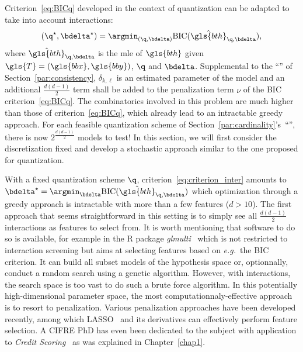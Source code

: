 Criterion~\eqref{eq:BICq} developed in the context of quantization can be adapted to take into account interactions:
\begin{equation} \label{eq:criterion_inter}
(\q^\star,\bdelta^\star) = \argmin_{(\q,\bdelta)} \text{BIC}(\hat{\gls{bth}}_{\q,\bdelta}),
\end{equation}
where $\hat{\gls{bth}}_{\q,\bdelta}$ is the \gls{mle} of $\gls{bth}$ given $\gls{T} = (\gls{bbx},\gls{bby})$, $\q$ and $\bdelta$. Supplemental to the ``'' of Section~\ref{par:consistency}, $\delta_{k,\ell}$ is an estimated parameter of the model and an additional $\frac{d(d-1)}{2}$ term shall be added to the penalization term $\nu$ of the BIC criterion~\eqref{eq:BICq}. The combinatorics involved in this problem are much higher than those of criterion~\eqref{eq:BICq}, which already lead to an intractable greedy approach. For each feasible quantization scheme of Section~\ref{par:cardinality}'s~``'', there is now $2^{\frac{d(d-1)}{2}}$ models to test! In this section, we will first consider the discretization fixed and develop a stochastic approach similar to the one proposed for quantization.

With a fixed quantization scheme $\q$, criterion~\ref{eq:criterion_inter} amounts to $\bdelta^\star = \argmin_{\bdelta} \text{BIC}(\hat{\gls{bth}}_{\q,\bdelta})$ which optimization through a greedy approach is intractable with more than a few features ($d > 10$). The first approach that seems straightforward in this setting is to simply see all $\frac{d(d-1)}{2}$ interactions as features to select from. It is worth mentioning that software to do so is available, for example in the \textsf{R} package \textit{glmulti}~\cite{calcagno2010glmulti} which is not restricted to interaction screening but aims at selecting features based on \textit{e.g.}\ the BIC criterion. It can build all subset models of the hypothesis space or, optionnally, conduct a random search using a genetic algorithm. However, with interactions, the search space is too vast to do such a brute force algorithm. In this potentially high-dimensional parameter space, the most computationnaly-effective approach is to resort to penalization. Various penalization approaches have been developed recently, among which LASSO~\cite{tibshirani1996regression} and its derivatives can effectively perform feature selection. A CIFRE PhD has even been dedicated to the subject with application to \textit{Credit Scoring}~\cite{vital2016} as was explained in Chapter~\ref{chap1}.

